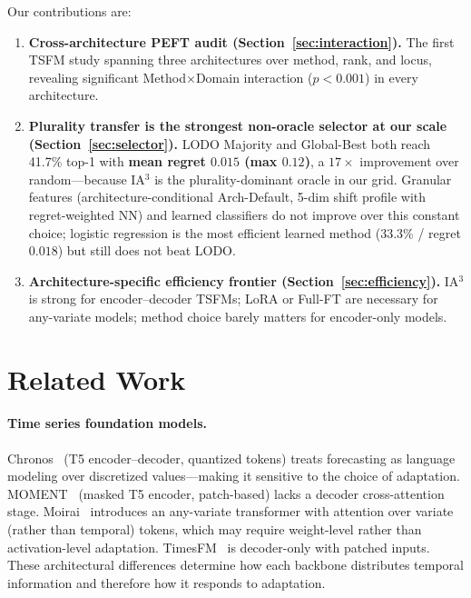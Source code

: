 \documentclass{article}
\begin{document}
Our contributions are:
\begin{enumerate}[nosep,leftmargin=*]
  \item \textbf{Cross-architecture PEFT audit (Section~\ref{sec:interaction}).} The first TSFM study spanning three architectures over method, rank, and locus, revealing significant Method$\times$Domain interaction ($p < 0.001$) in every architecture.
  \item \textbf{Plurality transfer is the strongest non-oracle selector at our scale (Section~\ref{sec:selector}).} LODO Majority and Global-Best both reach 41.7\% top-1 with \textbf{mean regret $0.015$ (max $0.12$)}, a $17{\times}$ improvement over random---because IA$^3$ is the plurality-dominant oracle in our grid. Granular features (architecture-conditional Arch-Default, 5-dim shift profile with regret-weighted NN) and learned classifiers do not improve over this constant choice; logistic regression is the most efficient learned method (33.3\% / regret $0.018$) but still does not beat LODO.
  \item \textbf{Architecture-specific efficiency frontier (Section~\ref{sec:efficiency}).} IA$^3$ is strong for encoder--decoder TSFMs; LoRA or Full-FT are necessary for any-variate models; method choice barely matters for encoder-only models.
\end{enumerate}

\section{Related Work}

\paragraph{Time series foundation models.}
Chronos~\citep{ansari2024chronos} (T5 encoder--decoder, quantized tokens) treats forecasting as language modeling over discretized values---making it sensitive to the choice of adaptation. MOMENT~\citep{goswami2024moment} (masked T5 encoder, patch-based) lacks a decoder cross-attention stage. Moirai~\citep{woo2024moirai} introduces an any-variate transformer with attention over variate (rather than temporal) tokens, which may require weight-level rather than activation-level adaptation. TimesFM~\citep{das2024timesfm} is decoder-only with patched inputs. These architectural differences determine how each backbone distributes temporal information and therefore how it responds to adaptation.
\end{document}
